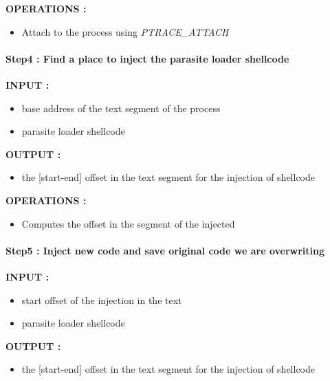 \documentclass[letterpaper,10pt,english]{sphinxmanual}
\begin{document}
\textbf{OPERATIONS :}
\begin{itemize}
\item {} 
Attach to the process using \emph{PTRACE\_ATTACH}

\end{itemize}


\paragraph{Step4 : Find a place to inject the parasite loader shellcode}
\label{Annexes/index:step4-find-a-place-to-inject-the-parasite-loader-shellcode}
\textbf{INPUT :}
\begin{itemize}
\item {} 
base address of the text segment of the process

\item {} 
parasite loader shellcode

\end{itemize}

\textbf{OUTPUT :}
\begin{itemize}
\item {} 
the {[}start-end{]} offset in the text segment for the injection of shellcode

\end{itemize}

\textbf{OPERATIONS :}
\begin{itemize}
\item {} 
Computes the offset in the segment of the injected

\end{itemize}


\paragraph{Step5 : Inject new code and save original code we are overwriting}
\label{Annexes/index:step5-inject-new-code-and-save-original-code-we-are-overwriting}
\textbf{INPUT :}
\begin{itemize}
\item {} 
start offset of the injection in the text

\item {} 
parasite loader shellcode

\end{itemize}

\textbf{OUTPUT :}
\begin{itemize}
\item {} 
the {[}start-end{]} offset in the text segment for the injection of shellcode

\end{itemize}
\end{document}
